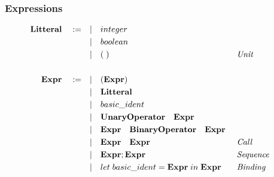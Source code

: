 \documentclass[
  12pt,
]{article}
\begin{document}
\hypertarget{expressions}{%
  \subsubsection{Expressions}\label{expressions}}

\begin{align*}
  \bf{Litteral}  \quad :=  \quad       & |\quad integer                                                                                                                       \\
                                       & |\quad boolean                                                                                                                       \\
                                       & |\quad (\;)                                                                                          &  & \textit{ Unit}             \\
  \\
  \bf{Expr}  \quad :=  \quad           & |\quad ( \textbf{Expr} )                                                                                                             \\
                                       & |\quad \textbf{Litteral}                                                                                                             \\
                                       & |\quad basic\_ident                                                                                                                  \\
                                       & |\quad \textbf{UnaryOperator}\quad \textbf{Expr}                                                                                     \\
                                       & |\quad \textbf{Expr}\quad \textbf{BinaryOperator}\quad \textbf{Expr}                                                                 \\
                                       & |\quad \textbf{Expr}\quad \textbf{Expr}                                                              &  & \textit{ Call}             \\
                                       & |\quad \textbf{Expr};\textbf{Expr}                                                                   &  & \textit{ Sequence }        \\
                                       & |\quad let \; basic\_ident = \textbf{Expr}\; in \; \textbf{Expr}                                     &  & \textit{ Binding}          \\

\end{align*}
\end{document}
